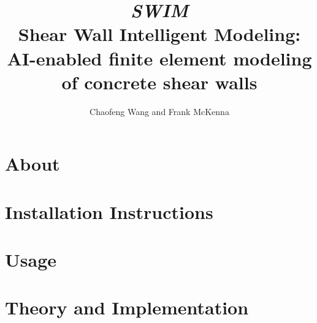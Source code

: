 \documentclass{simcenterdocumentation}
\begin{document}
\title{     {\selectfont \textbf{\textit{SWIM}} }       \\ Shear Wall Intelligent Modeling: AI-enabled finite element modeling of concrete shear walls}
\author{Chaofeng Wang and Frank McKenna}

\hypersetup{pageanchor=false}
\maketitle
\copyrightpage
\acknowledgments

\hypersetup{pageanchor=true}
\begin{frontmatter}

\pagestyle{plain}
{
  \renewcommand{\thispagestyle}[1]{}
  \tableofcontents
  \clearpage
  \listoffigures
  \clearpage
  \listoftables
}

\end{frontmatter}
\pagestyle{somewhatsimple}

\chapter{About}
\label{chap:about}


\chapter{Installation Instructions}
\label{chap:installation}


\chapter{Usage}
\label{chap:usage}


\chapter{Theory and Implementation}
\label{chap:theory}

\end{document}
